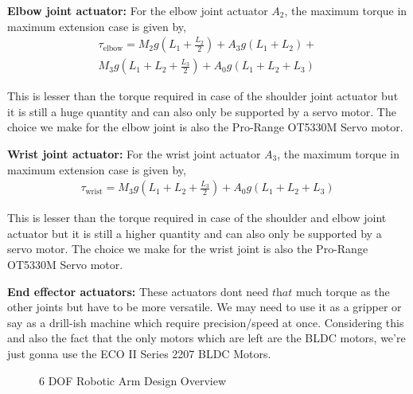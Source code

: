 \documentclass[12pt]{article}
\providecommand{\brak}[1]{\ensuremath{\left(#1\right)}}
\begin{document}
\textbf{Elbow joint actuator:} 
For the elbow joint actuator $A_2$, the maximum torque in maximum extension case is given by,
\begin{multline*}
    \tau_{\text{elbow}} = M_2 g \brak{L_1 + \frac{L_2}{2}} + A_3 g \brak{L_1 + L_2} + \\ M_3 g \brak{L_1 + L_2 + \frac{L_3}{2}} + A_0 g \brak{L_1 + L_2 + L_3}
\end{multline*}

This is lesser than the torque required in case of the shoulder joint actuator but it is still a huge quantity and can also only be supported by a servo motor. The choice we make for the elbow joint is also the Pro-Range OT5330M Servo motor.

\textbf{Wrist joint actuator:} 
For the wrist joint actuator $A_3$, the maximum torque in maximum extension case is given by,
\begin{align*}
    \tau_{\text{wrist}} = M_3 g \brak{L_1 + L_2 + \frac{L_3}{2}} + A_0 g \brak{L_1 + L_2 + L_3}
\end{align*}

This is lesser than the torque required in case of the shoulder and elbow joint actuator but it is still a higher quantity and can also only be supported by a servo motor. The choice we make for the wrist joint is also the Pro-Range OT5330M Servo motor.

\textbf{End effector actuators:} These actuators dont need $\textit{that}$ much torque as the other joints but have to be more versatile. We may need to use it as a gripper or say as a drill-ish machine which require precision/speed at once. Considering this and also the fact that the only motors which are left are the BLDC motors, we're just gonna use the ECO II Series 2207 BLDC Motors.

\begin{figure}[!ht]
\centering
{}%

\label{fig:my_label}
    \caption{6 DOF Robotic Arm Design Overview}
\end{figure}
\FloatBarrier
\end{document}
